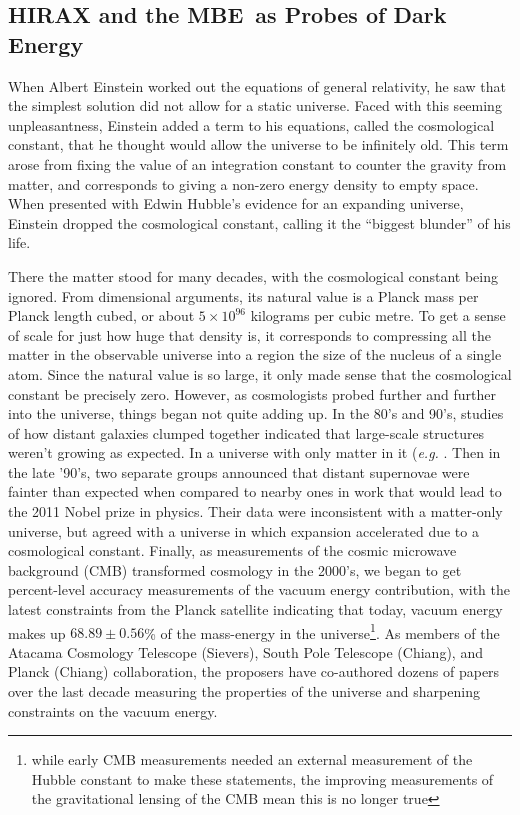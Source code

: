 \documentclass[letterpaper,11pt,preprint]{aastex}
\newcommand{\mbe}{{\rm MBE}}
\begin{document}
\subsection{HIRAX and the \mbe\ as  Probes of Dark Energy}

When Albert Einstein worked out the equations of general relativity,
he saw that the simplest solution did not allow for a static
universe. Faced with this seeming unpleasantness, Einstein added a
term to his equations, called the cosmological constant, that he
thought would allow the universe to be infinitely old.  This term
arose from fixing the value of an integration constant to counter the
gravity from matter, and corresponds to giving a non-zero energy
density to empty space.  When presented with Edwin Hubble's evidence
for an expanding universe, Einstein dropped the cosmological constant,
calling it the ``biggest blunder'' of his life.  

There the matter stood for many decades, with the cosmological
constant being ignored.  From dimensional arguments, its natural value
is a Planck mass per Planck length cubed, or about $5\times 10^{96}$
kilograms per cubic metre.  To get a sense of scale for just how huge
that density is, it corresponds to compressing all the matter in the
observable universe into a region the size of the nucleus of a single
atom.  Since the natural value is so large, it only made sense that
the cosmological constant be precisely zero.  However, as cosmologists
probed further and further into the universe, things began not quite
adding up.  In the 80's and 90's, studies of how distant galaxies
clumped together indicated that large-scale structures weren't growing
as expected.  In a universe with only matter in it ({\textit{e.g.}
  \citet{Park94}}.  Then in the late '90's, two separate groups
announced that distant supernovae were fainter than expected when
compared to nearby ones \citep{Riess98,Perlmutter99} in work that
would lead to the 2011 Nobel prize in physics.  Their data were
inconsistent with a matter-only universe, but agreed with a universe
in which expansion accelerated due to a cosmological constant.
Finally, as measurements of the cosmic microwave background (CMB)
transformed cosmology in the 2000's, we began to get percent-level
accuracy measurements of the vacuum energy contribution, with the
latest constraints from the Planck satellite indicating that today,
vacuum energy makes up $68.89\pm0.56$\% of the mass-energy in the
universe\footnote{while early CMB measurements needed an external
  measurement of the Hubble constant to make these statements, the
  improving measurements of the gravitational lensing of the CMB mean
  this is no longer true}\citep{Planck2018Params}.  As members of the
Atacama Cosmology Telescope (Sievers), South Pole Telescope (Chiang),
and Planck (Chiang) collaboration, the proposers have co-authored
dozens of papers over the last decade measuring the properties of the
universe and sharpening constraints on the vacuum energy.  
\end{document}
